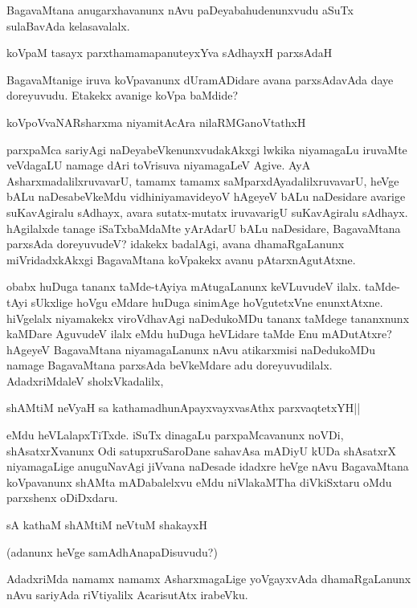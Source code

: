 BagavaMtana anugarxhavanunx nAvu paDeyabahudenunxvudu aSuTx sulaBavAda kelasavalalx.

\begin{shloka}
koVpaM tasayx parxthamamapanuteyxYva sAdhayxH parxsAdaH
\end{shloka}

BagavaMtanige iruva koVpavanunx dUramADidare avana parxsAdavAda daye doreyuvudu. Etakekx avanige koVpa baMdide?

\begin{shloka}
koVpoVvaNARsharxma niyamitAcAra nilaRMGanoVtathxH
\end{shloka}

parxpaMca sariyAgi naDeyabeVkenunxvudakAkxgi lwkika niyamagaLu iruvaMte veVdagaLU namage dAri toVrisuva niyamagaLeV Agive. AyA AsharxmadalilxruvavarU, tamamx tamamx saMparxdAyadalilxruvavarU, heVge bALu naDesabeVkeMdu vidhiniyamavideyoV hAgeyeV bALu naDesidare avarige suKavAgiralu sAdhayx, avara sutatx-mutatx iruvavarigU suKavAgiralu sAdhayx. hAgilalxde tanage iSaTxbaMdaMte yArAdarU bALu naDesidare, BagavaMtana parxsAda doreyuvudeV? idakekx badalAgi, avana dhamaRgaLanunx miVridadxkAkxgi BagavaMtana koVpakekx avanu pAtarxnAgutAtxne.

obabx huDuga tananx taMde-tAyiya mAtugaLanunx keVLuvudeV ilalx. taMde-tAyi sUkxlige hoVgu eMdare huDuga sinimAge hoVgutetxVne enunxtAtxne. hiVgelalx niyamakekx viroVdhavAgi naDedukoMDu tananx taMdege tananxnunx kaMDare AguvudeV ilalx eMdu huDuga heVLidare taMde Enu mADutAtxre? hAgeyeV BagavaMtana niyamagaLanunx nAvu atikarxmisi naDedukoMDu namage BagavaMtana parxsAda beVkeMdare adu doreyuvudilalx. AdadxriMdaleV sholxVkadalilx,

\begin{shloka}
shAMtiM neVyaH sa kathamadhunApayxvayxvasAthx parxvaqtetxYH||
\end{shloka}

eMdu heVLalapxTiTxde. iSuTx dinagaLu parxpaMcavanunx noVDi, shAsatxrXvanunx Odi satupxruSaroDane sahavAsa mADiyU kUDa shAsatxrX niyamagaLige anuguNavAgi jiVvana naDesade idadxre heVge nAvu BagavaMtana koVpavanunx shAMta mADabalelxvu eMdu niVlakaMTha diVkiSxtaru oMdu parxshenx oDiDxdaru.

\begin{shloka}
sA kathaM shAMtiM neVtuM shakayxH
\end{shloka}

(adanunx heVge samAdhAnapaDisuvudu?)

AdadxriMda namamx namamx AsharxmagaLige yoVgayxvAda dhamaRgaLanunx nAvu sariyAda riVtiyalilx AcarisutAtx irabeVku.

